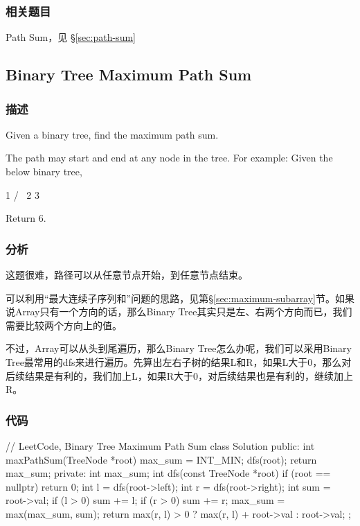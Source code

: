 \subsubsection{相关题目}
\begindot
\item Path Sum，见 \S \ref{sec:path-sum}
\myenddot


\subsection{Binary Tree Maximum Path Sum}
\label{sec:binary-tree-maximum-path-sum}


\subsubsection{描述}
Given a binary tree, find the maximum path sum.

The path may start and end at any node in the tree.
For example:
Given the below binary tree,
\begin{Code}
  1
 / \
2   3
\end{Code}
Return $6$.


\subsubsection{分析}
这题很难，路径可以从任意节点开始，到任意节点结束。

可以利用“最大连续子序列和”问题的思路，见第\S \ref{sec:maximum-subarray}节。如果说Array只有一个方向的话，那么Binary Tree其实只是左、右两个方向而已，我们需要比较两个方向上的值。

不过，Array可以从头到尾遍历，那么Binary Tree怎么办呢，我们可以采用Binary Tree最常用的dfs来进行遍历。先算出左右子树的结果L和R，如果L大于0，那么对后续结果是有利的，我们加上L，如果R大于0，对后续结果也是有利的，继续加上R。

\subsubsection{代码}

\begin{Code}
// LeetCode, Binary Tree Maximum Path Sum
class Solution {
public:
    int maxPathSum(TreeNode *root) {
        max_sum = INT_MIN;
        dfs(root);
        return max_sum;
    }
private:
    int max_sum;
    int dfs(const TreeNode *root) {
        if (root == nullptr) return 0;
        int l = dfs(root->left);
        int r = dfs(root->right);
        int sum = root->val;
        if (l > 0) sum += l;
        if (r > 0) sum += r;
        max_sum = max(max_sum, sum);
        return max(r, l) > 0 ? max(r, l) + root->val : root->val;
    }
};
\end{Code}

